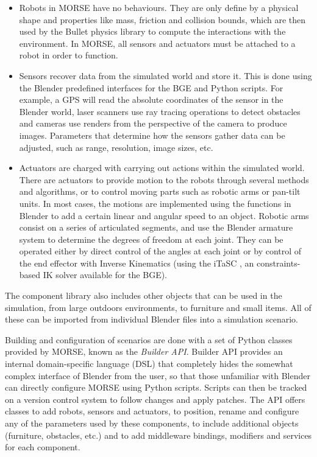 \documentclass{llncs}
\newcommand{\serge}[1]{\nb{Serge}{blue}{#1}}
\begin{document}
\begin{itemize}
  \item Robots in MORSE have no behaviours. They are only define by a physical
    shape and properties like mass, friction and collision bounds, which are
    then used by the Bullet physics library to compute the interactions with the
    environment.
    In MORSE, all sensors and actuators must be attached to a robot in order to
    function.
    \serge{Are robots really components ?}
  \item Sensors recover data from the simulated world and store it. This is
    done using the Blender predefined interfaces for the BGE and Python scripts.
    For example, a GPS will read the absolute coordinates of the sensor in the
    Blender world, laser scanners use ray tracing operations to detect
    obstacles and cameras use renders from the perspective of the camera to
    produce images. Parameters that determine how the sensors gather data can
    be adjusted, such as range, resolution, image sizes, etc.
  \item Actuators are charged with carrying out actions within the simulated
    world. There are actuators to provide motion to the robots through several
    methods and algorithms, or to control moving parts such as robotic arms or
    pan-tilt units. In most cases, the motions are implemented using the
    functions in Blender to add a certain linear and angular speed to an
    object.
    Robotic arms consist on a series of articulated segments, and use the
    Blender armature system to determine the degrees of freedom at each joint.
    They can be operated either by direct control of the angles at each joint
    or by control of the end effector with Inverse Kinematics (using the iTaSC
    \cite{iTaSC}, an constraints-based IK solver available for the BGE).
\end{itemize}

The component library also includes other objects that can be used in the
simulation, from large outdoors environments, to furniture and small items.
All of these can be imported from individual Blender files into a simulation
scenario.

Building and configuration of scenarios are done with a set of Python
classes provided by MORSE, known as the \emph{Builder API}. 
Builder API provides an internal domain-specific language (DSL) that completely hides
the somewhat complex interface of Blender from the user, so that those unfamiliar with Blender
can directly configure MORSE using Python scripts. Scripts can then be tracked
on a version control system to follow changes and apply patches.
The API offers classes to add robots, sensors and actuators, to position,
rename and configure any of the parameters used by these components, to
include additional objects (furniture, obstacles, etc.) and to add middleware
bindings, modifiers and services for each component.
\end{document}
